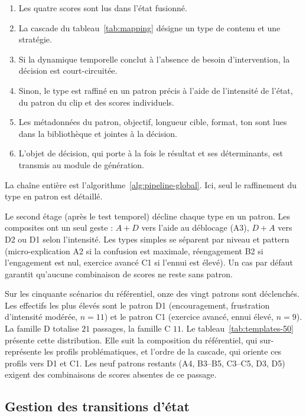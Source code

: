 \begin{enumerate}[itemsep=2pt, topsep=3pt]
\item Les quatre scores sont lus dans l'état fusionné.
\item La cascade du tableau~\ref{tab:mapping} désigne un type de contenu
      et une stratégie.
\item Si la dynamique temporelle conclut à l'absence de besoin d'intervention, la
      décision est court-circuitée.
\item Sinon, le type est raffiné en un patron précis à l'aide de l'intensité de
      l'état, du patron du clip et des scores individuels.
\item Les métadonnées du patron, objectif, longueur cible, format, ton sont
      lues dans la bibliothèque et jointes à la décision.
\item L'objet de décision, qui porte à la fois le résultat et ses déterminants,
      est transmis au module de génération.
\end{enumerate}

La chaîne entière est l'algorithme~\ref{alg:pipeline-global}.
Ici, seul le raffinement du type en patron est détaillé.

Le second étage (après le test
temporel) décline chaque type en un patron. Les composites ont un seul
geste : $A{+}D$ vers l'aide au déblocage (A3), $D{+}A$ vers D2 ou D1
selon l'intensité. Les types simples se séparent par niveau et pattern
(micro-explication A2 si la confusion est maximale, réengagement B2 si
l'engagement est nul, exercice avancé C1 si l'ennui est élevé). Un cas
par défaut garantit qu'aucune combinaison de scores ne reste sans
patron.

Sur les cinquante scénarios du référentiel, onze des vingt patrons
sont déclenchés. Les effectifs les plus élevés sont le patron D1
(encouragement, frustration d'intensité modérée, $n=11$) et le
patron C1 (exercice avancé, ennui élevé, $n=9$). La famille D
totalise $21$ passages, la famille C $11$.
Le tableau~\ref{tab:templates-50} présente cette distribution.
Elle suit la composition du référentiel, qui sur-représente les
profils problématiques, et l'ordre de la cascade, qui oriente ces
profils vers D1 et C1. Les neuf patrons restants (A4, B3--B5,
C3--C5, D3, D5) exigent des combinaisons de scores absentes de ce
passage.

\subsection{Gestion des transitions d'état}
\label{subsec:impl-transitions}

